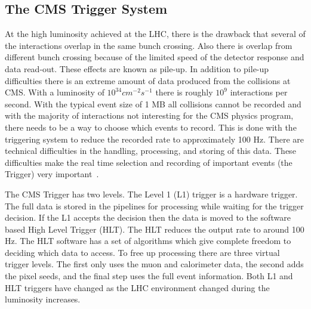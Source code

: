 \subsection{The CMS Trigger System}

At the high luminosity achieved at the LHC, there is the drawback that several of the interactions overlap in the same bunch crossing. Also there is overlap from different bunch crossing because of the limited speed of the detector response and data read-out.  These effects are known as pile-up.  In addition to pile-up difficulties there is an extreme amount of data produced from the collisions at CMS. With a luminosity of $10^{34}cm^{-2}s^{-1}$ there is roughly $10^9$ interactions per second.  With the typical event size of 1 MB all collisions cannot be recorded and with the majority of interactions not interesting for the CMS physics program, there needs to be a way to choose which events to record.  This is done with the triggering system to reduce the recorded rate to approximately 100 Hz. There are technical difficulties in the handling, processing, and storing of this data. These difficulties make the real time selection and recording of important events (the Trigger) very important~\cite{Bayatyan:706847}.

The CMS Trigger has two levels.  The Level 1 (L1) trigger is a hardware trigger.  The full data is stored in the pipelines for processing while waiting for the trigger decision.  If the L1 accepts the decision then the data is moved to the software based High Level Trigger (HLT).  The HLT reduces the output rate to around 100 Hz. The HLT software has a set of algorithms which give complete freedom to deciding which data to access.  To free up processing there are three virtual trigger levels.  The first only uses the muon and calorimeter data, the second adds the pixel seeds, and the final step uses the full event information. Both L1 and HLT triggers have changed as the LHC environment changed during the luminosity increases.

